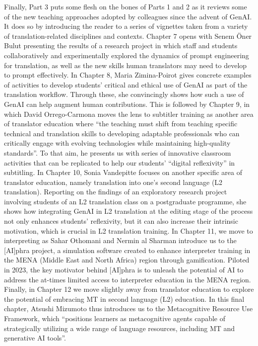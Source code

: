 \documentclass[output=paper]{langscibook}
\begin{document}
Finally, Part 3 puts some flesh on the bones of Parts 1 and 2 as it reviews some of the new teaching approaches adopted by colleagues since the advent of GenAI. It does so by introducing the reader to a series of vignettes taken from a variety of translation-related disciplines and contexts. Chapter 7 opens with Senem Öner Bulut presenting the results of a research project in which staff and students collaboratively and experimentally explored the dynamics of prompt engineering for translation, as well as the new skills human translators may need to develop to prompt effectively. In Chapter 8, Maria Zimina-Poirot gives concrete examples of activities to develop students’ critical and ethical use of GenAI as part of the translation workflow. Through these, she convincingly shows how such a use of GenAI can help augment human contributions. This is followed by Chapter 9, in which David Orrego-Carmona moves the lens to subtitler training as another area of translator education where “the teaching must shift from teaching specific technical and translation skills to developing adaptable professionals who can critically engage with evolving technologies while maintaining high-quality standards”. To that aim, he presents us with series of innovative classroom activities that can be replicated to help our students’ “digital reflexivity” in subtitling. In Chapter 10, Sonia Vandepitte focuses on another specific area of translator education, namely translation into one’s second language (L2 translation). Reporting on the findings of an exploratory research project involving students of an L2 translation class on a postgraduate programme, she shows how integrating GenAI in L2 translation at the editing stage of the process not only enhances students’ reflexivity, but it can also increase their intrinsic motivation, which is crucial in L2 translation training. In Chapter 11, we move to interpreting as Sahar Othomani and Nermin al Sharman introduce us to the [AI]phra project, a simulation software created to enhance interpreter training in the MENA (Middle East and North Africa) region through gamification. Piloted in 2023, the key motivator behind [AI]phra is to unleash the potential of AI to address the at-times limited access to interpreter education in the MENA region. Finally, in Chapter 12 we move slightly away from translator education to explore the potential of embracing MT in second language (L2) education. In this final chapter, Atsushi Mizumoto thus introduces us to the Metacognitive Resource Use Framework, which “positions learners as metacognitive agents capable of strategically utilizing a wide range of language resources, including MT and generative AI tools”.
\end{document}
